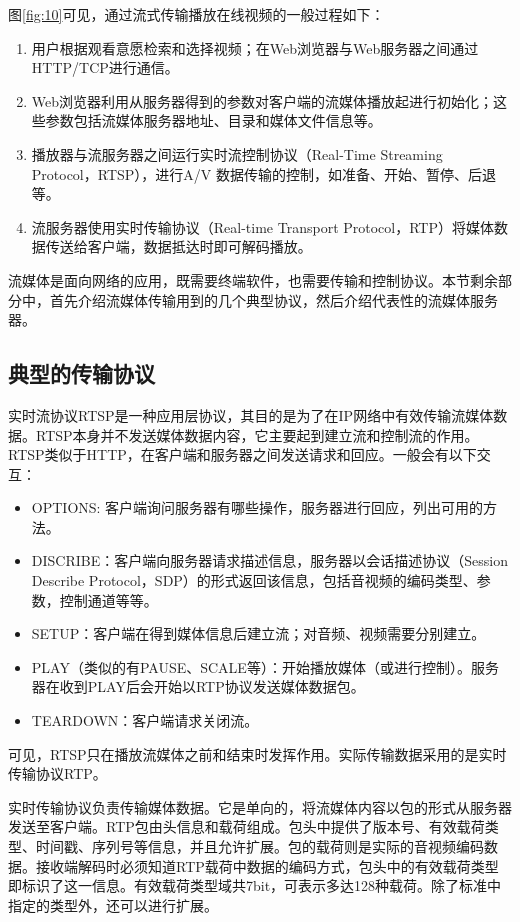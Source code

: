 图\ref{fig:10}可见，通过流式传输播放在线视频的一般过程如下：
\begin{enumerate}
\item 用户根据观看意愿检索和选择视频；在Web浏览器与Web服务器之间通过HTTP/TCP进行通信。
\item Web浏览器利用从服务器得到的参数对客户端的流媒体播放起进行初始化；这些参数包括流媒体服务器地址、目录和媒体文件信息等。
\item 播放器与流服务器之间运行实时流控制协议（Real-Time Streaming Protocol，RTSP），进行A/V 数据传输的控制，如准备、开始、暂停、后退等。
\item 流服务器使用实时传输协议（Real-time Transport Protocol，RTP）将媒体数据传送给客户端，数据抵达时即可解码播放。
\end{enumerate}

流媒体是面向网络的应用，既需要终端软件，也需要传输和控制协议。本节剩余部分中，首先介绍流媒体传输用到的几个典型协议，然后介绍代表性的流媒体服务器。

\subsection{典型的传输协议}
\label{subsec:protocols}

实时流协议RTSP是一种应用层协议，其目的是为了在IP网络中有效传输流媒体数据。RTSP本身并不发送媒体数据内容，它主要起到建立流和控制流的作用。RTSP类似于HTTP，在客户端和服务器之间发送请求和回应。一般会有以下交互：
\begin{itemize}
\item OPTIONS: 客户端询问服务器有哪些操作，服务器进行回应，列出可用的方法。
\item DISCRIBE：客户端向服务器请求描述信息，服务器以会话描述协议（Session Describe Protocol，SDP）的形式返回该信息，包括音视频的编码类型、参数，控制通道等等。
\item SETUP：客户端在得到媒体信息后建立流；对音频、视频需要分别建立。
\item PLAY（类似的有PAUSE、SCALE等）：开始播放媒体（或进行控制）。服务器在收到PLAY后会开始以RTP协议发送媒体数据包。
\item TEARDOWN：客户端请求关闭流。
\end{itemize}

可见，RTSP只在播放流媒体之前和结束时发挥作用。实际传输数据采用的是实时传输协议RTP。

实时传输协议负责传输媒体数据。它是单向的，将流媒体内容以包的形式从服务器发送至客户端。RTP包由头信息和载荷组成\supercite{RTP}。包头中提供了版本号、有效载荷类型、时间戳、序列号等信息，并且允许扩展。包的载荷则是实际的音视频编码数据。接收端解码时必须知道RTP载荷中数据的编码方式，包头中的有效载荷类型即标识了这一信息。有效载荷类型域共7bit，可表示多达128种载荷。除了标准中指定的类型外，还可以进行扩展。

